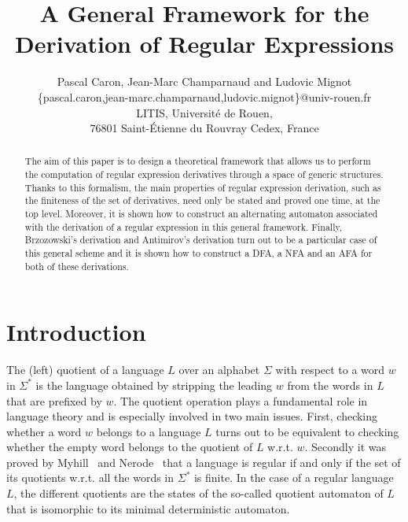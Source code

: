 \documentclass{article}
\begin{document}
\title{A General Framework for the Derivation of Regular Expressions}

  \author{
    Pascal Caron, Jean-Marc Champarnaud and Ludovic Mignot\\
    \{pascal.caron,jean-marc.champarnaud,ludovic.mignot\}@univ-rouen.fr\\
    LITIS, Universit\'e de Rouen,\\
     76801 Saint-\'Etienne du Rouvray Cedex, France
  }

  \maketitle

  
   \begin{abstract}
The aim of this paper is to design a theoretical 
framework
that allows us to perform the computation of regular expression derivatives through a space of generic structures.
Thanks to this formalism, the main properties of regular expression derivation, such as 
the finiteness of the set of derivatives,
need only be stated and proved one time, at the top level. 
Moreover, it is shown how to
construct an alternating automaton
associated with the derivation of a regular expression in this general 
framework.
Finally, Brzozowski's derivation and Antimirov's derivation turn out to be a particular case of this general scheme
and it is shown how to construct a DFA, a NFA and an AFA for both of these derivations.
  \end{abstract}
 

\section{Introduction}


The (left) quotient of a language $L$ over an alphabet $\Sigma$ with respect to a word $w$ in $\Sigma^*$
is the language obtained by stripping the leading $w$ from the words in $L$ that are prefixed by $w$. 
The quotient operation plays a fundamental role in language theory and is especially involved in two main issues.
First, checking whether a word $w$ belongs to a language $L$
turns out to be equivalent to checking whether the empty word belongs to the quotient of $L$ w.r.t. $w$. 
Secondly it was proved by Myhill~\cite{Myh57} and Nerode~\cite{Ner58} that a language is regular
if and only if the set of its quotients w.r.t. all the words in $\Sigma^*$ is finite.
In the case of a regular language $L$, 
the different quotients are the states of the so-called quotient automaton of $L$
that is isomorphic to its minimal deterministic automaton.
\end{document}
